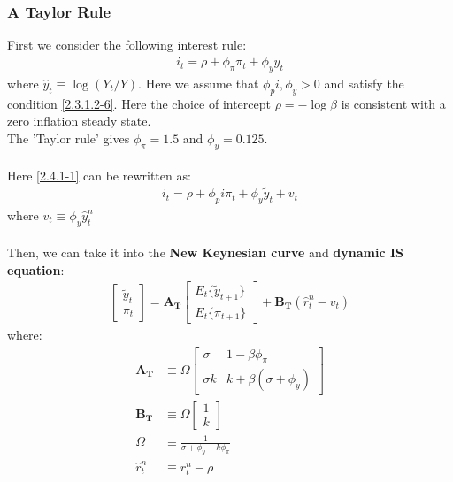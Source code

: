 \documentclass{article}
\numberwithin{equation}{section}
\begin{document}
\subsubsection{A Taylor Rule}
First we consider the following interest rule:
	\begin{align}
		i_t = \rho + \phi_\pi \pi_t + \phi_y \hat{y}_t \label{2.4.1-1}
	\end{align}
where $\hat{y}_t \equiv \log(Y_t/Y)$. Here we assume that $\phi_pi, \phi_y > 0$ and satisfy the condition \eqref{2.3.1.2-6}. Here the choice of intercept $\rho = -\log\beta$ is consistent with a zero inflation steady state.\\
The 'Taylor rule' gives $\phi_\pi = 1.5$ and $\phi_y = 0.125$.\\\\
Here \eqref{2.4.1-1} can be rewritten as:
	\begin{align}
		i_t = \rho + \phi_pi \pi_t + \phi_y \tilde{y}_t + v_t
	\end{align}
where $v_t \equiv \phi_y \hat{y}^n_t$\\\\
Then, we can take it into the \textbf{New Keynesian curve} and \textbf{dynamic IS equation}:
	\begin{align*}
		\begin{bmatrix}
			\tilde{y}_t\\
			\pi_t
		\end{bmatrix} = \boldsymbol{A_T}
		\begin{bmatrix}
			E_t\{ \tilde{y}_{t+1} \}\\
			E_t\{ \pi_{t+1} \}
		\end{bmatrix} + \boldsymbol{B_T}(\hat{r}^n_t - v_t)
	\end{align*}
where:
	\begin{align*}
		\boldsymbol{A_T} &\equiv \Omega \begin{bmatrix}
									   		\sigma & 1 - \beta\phi_\pi\\
									   		\sigma k & k + \beta(\sigma + \phi_y)
									   \end{bmatrix}\\
		\boldsymbol{B_T} &\equiv \Omega \begin{bmatrix}
											1\\
											k
										\end{bmatrix}\\
		\Omega &\equiv \frac{1}{\sigma + \phi_y + k\phi_\pi}\\
		\hat{r}^n_t &\equiv r^n_t - \rho
	\end{align*}
\end{document}

